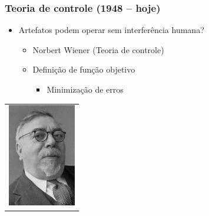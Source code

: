 \documentclass[aspectratio=169]{beamer}
\begin{document}
	\begin{frame}
		\frametitle{Teoria de controle (1948 – hoje)}
		\begin{itemize}
			\item Artefatos podem operar sem interferência humana?
			\begin{itemize}
				\item Norbert Wiener (Teoria de controle)
				\item Definição de função objetivo
				\begin{itemize}
					\item Minimização de erros
				\end{itemize}
			\end{itemize}
		\end{itemize}
		
		\begin{table}
			\centering
			\begin{tabular}{c}				
				\includegraphics[height=4.5cm, keepaspectratio]{../figs/cap01/wiener.png} \\		
				
			\end{tabular}
		\end{table}
	\end{frame}
\end{document}
